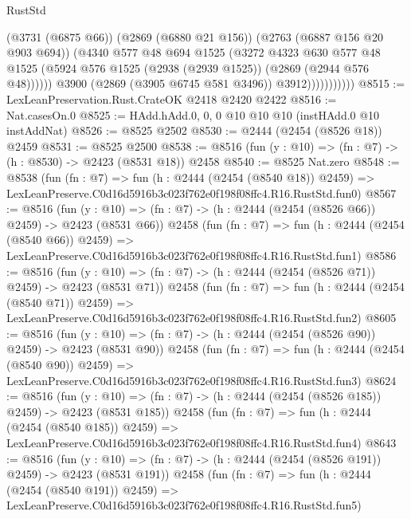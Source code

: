 \begin{lexlean}{RustStd}
\begin{coremodule}
                            (@3731 (@6875 @66))
                            (@2869 (@6880 @21 @156))
                            (@2763 (@6887 @156 @20 @903 @694))
                            (@4340
                              @577
                              @48
                              @694
                              @1525
                              (@3272
                                @4323
                                @630
                                @577
                                @48
                                @1525
                                (@5924 @576 @1525 (@2938 (@2939 @1525)) (@2869 (@2944 @576 @48))))))
                          @3900
                          (@2869 (@3905 @6745 @581 @3496))
                          @3912)))))))))))
@8515 := LexLeanPreservation.Rust.CrateOK @2418 @2420 @2422
@8516 := Nat.casesOn.{0}
@8525 := HAdd.hAdd.{0, 0, 0} @10 @10 @10 (instHAdd.{0} @10 instAddNat)
@8526 := @8525 @2502
@8530 := @2444 (@2454 (@8526 @18)) @2459
@8531 := @8525 @2500
@8538 := @8516 (fun (y : @10) => (fn : @7) -> (h : @8530) -> @2423 (@8531 @18)) @2458
@8540 := @8525 Nat.zero
@8548 := @8538
    (fun (fn : @7) =>
    fun (h : @2444 (@2454 (@8540 @18)) @2459) =>
    LexLeanPreserve.C0d16d5916b3c023f762e0f198f08ffc4.R16.RustStd.fun0)
@8567 := @8516
    (fun (y : @10) => (fn : @7) -> (h : @2444 (@2454 (@8526 @66)) @2459) -> @2423 (@8531 @66))
    @2458
    (fun (fn : @7) =>
    fun (h : @2444 (@2454 (@8540 @66)) @2459) =>
    LexLeanPreserve.C0d16d5916b3c023f762e0f198f08ffc4.R16.RustStd.fun1)
@8586 := @8516
    (fun (y : @10) => (fn : @7) -> (h : @2444 (@2454 (@8526 @71)) @2459) -> @2423 (@8531 @71))
    @2458
    (fun (fn : @7) =>
    fun (h : @2444 (@2454 (@8540 @71)) @2459) =>
    LexLeanPreserve.C0d16d5916b3c023f762e0f198f08ffc4.R16.RustStd.fun2)
@8605 := @8516
    (fun (y : @10) => (fn : @7) -> (h : @2444 (@2454 (@8526 @90)) @2459) -> @2423 (@8531 @90))
    @2458
    (fun (fn : @7) =>
    fun (h : @2444 (@2454 (@8540 @90)) @2459) =>
    LexLeanPreserve.C0d16d5916b3c023f762e0f198f08ffc4.R16.RustStd.fun3)
@8624 := @8516
    (fun (y : @10) => (fn : @7) -> (h : @2444 (@2454 (@8526 @185)) @2459) -> @2423 (@8531 @185))
    @2458
    (fun (fn : @7) =>
    fun (h : @2444 (@2454 (@8540 @185)) @2459) =>
    LexLeanPreserve.C0d16d5916b3c023f762e0f198f08ffc4.R16.RustStd.fun4)
@8643 := @8516
    (fun (y : @10) => (fn : @7) -> (h : @2444 (@2454 (@8526 @191)) @2459) -> @2423 (@8531 @191))
    @2458
    (fun (fn : @7) =>
    fun (h : @2444 (@2454 (@8540 @191)) @2459) =>
    LexLeanPreserve.C0d16d5916b3c023f762e0f198f08ffc4.R16.RustStd.fun5)

\end{coremodule}
\end{lexlean}
